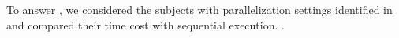 To answer \numRQD{}, we considered the \numProjectsPar{} subjects with
parallelization settings identified in \numRQC{} and compared their
time cost with sequential execution.  
.

\Fix{---------------------}


